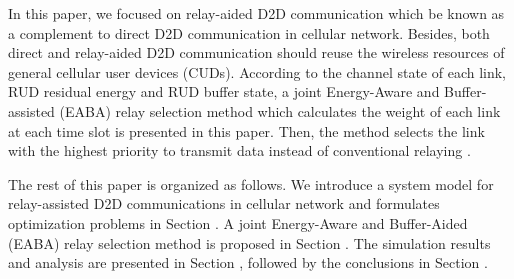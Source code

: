 \documentclass[conference]{IEEEtran}
\begin{document}
In this paper, we focused on relay-aided D2D communication which be known as a complement to direct D2D communication in cellular network. Besides, both direct and relay-aided D2D communication should reuse the wireless resources of general cellular user devices (CUDs). According to the channel state of each link, RUD residual energy and RUD buffer state, a joint  Energy-Aware and Buffer-assisted (EABA) relay selection method which calculates the weight of each link at each time slot is presented in this paper. Then, the method selects the link with the highest priority to transmit data instead of conventional relaying \cite{7562509}.

The rest of this paper is organized as follows. We introduce a system model for relay-assisted D2D communications in cellular network and formulates optimization problems in Section \uppercase\expandafter{}. A joint Energy-Aware and Buffer-Aided (EABA) relay selection method is proposed in Section \uppercase\expandafter{}. The simulation results and analysis are presented in Section \uppercase\expandafter{}, followed by the conclusions in Section \uppercase\expandafter{}.
\end{document}
